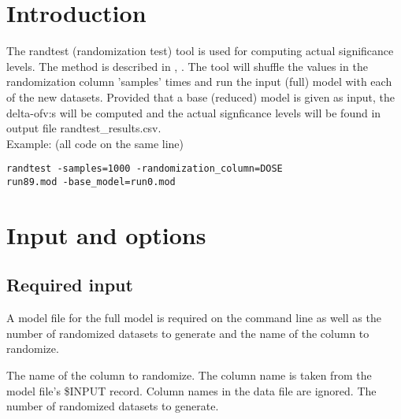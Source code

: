 

\usepackage{hyperref}


\maketitle
\newcommand{\guidetoolname}{randtest}
\tableofcontents
\newpage

\section{Introduction}

The randtest (randomization test) tool is used for computing actual significance levels. The method is described in \cite{Wahlby}, \cite{Deng}. 
The tool will shuffle the values in the randomization column ’samples’ times and run the input (full) model with each of the new datasets. Provided that a base (reduced) model is given as input, the delta-ofv:s will be computed and the actual signficance levels will be found in output file randtest\_results.csv.\\
Example: (all code on the same line)
\begin{verbatim}
randtest -samples=1000 -randomization_column=DOSE 
run89.mod -base_model=run0.mod
\end{verbatim}

\section{Input and options}
\subsection{Required input}
A model file for the full model is required on the command line as well as the number of randomized datasets to generate and the name of the column to randomize.
\begin{optionlist}
	The name of the column to randomize. The column name is taken from the model file's \$INPUT record. Column names in the data file are ignored. 
\nextopt
{}
The number of randomized datasets to generate. 
\nextopt
\end{optionlist}

